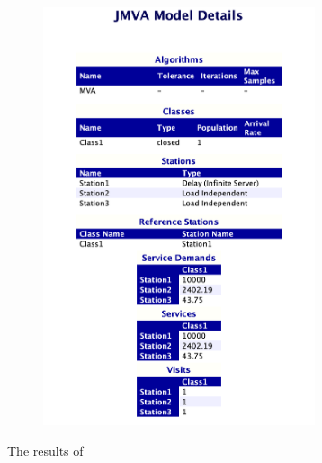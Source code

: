 \documentclass[11pt]{scrartcl} %
\begin{document}
\begin{figure}[H]
\centering
\includegraphics[width=8cm]{Images/JMVAsynopsis.png}
\end{figure}

The results of 
\end{document}
